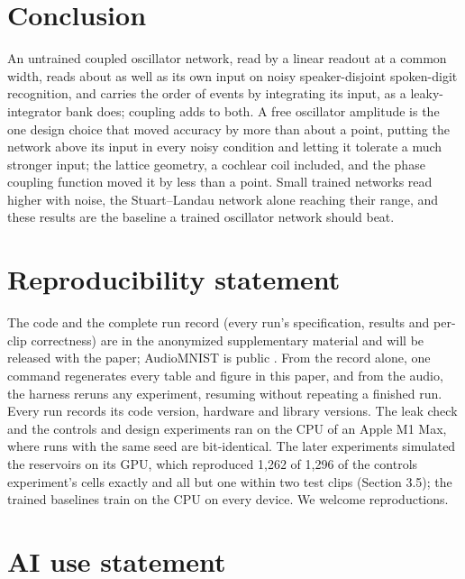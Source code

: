 \documentclass[10pt]{article}
\makeatletter
\newcommand{\tmlr@floatbarrier}{\par\vspace{\z@}%
  \ifx\@deferlist\@empty\else\clearpage\fi}
\let\tmlr@section\section
\renewcommand{\section}{\tmlr@floatbarrier\tmlr@section}
\makeatother
\begin{document}
\section{Conclusion}\label{conclusion}

An untrained coupled oscillator network, read by a linear readout at a
common width, reads about as well as its own input on noisy
speaker-disjoint spoken-digit recognition, and carries the order of
events by integrating its input, as a leaky-integrator bank does;
coupling adds to both. A free oscillator amplitude is the one design
choice that moved accuracy by more than about a point, putting the
network above its input in every noisy condition and letting it tolerate
a much stronger input; the lattice geometry, a cochlear coil included,
and the phase coupling function moved it by less than a point. Small
trained networks read higher with noise, the Stuart--Landau network
alone reaching their range, and these results are the baseline a trained
oscillator network should beat.

\section*{Reproducibility statement}\label{reproducibility-statement}

The code and the complete run record (every run's specification, results
and per-clip correctness) are in the anonymized supplementary material
and will be released with the paper; AudioMNIST is public
\citep{becker2024}. From the record alone, one command regenerates every
table and figure in this paper, and from the audio, the harness reruns
any experiment, resuming without repeating a finished run. Every run
records its code version, hardware and library versions. The leak check
and the controls and design experiments ran on the CPU of an Apple M1
Max, where runs with the same seed are bit-identical. The later
experiments simulated the reservoirs on its GPU, which reproduced 1,262
of 1,296 of the controls experiment's cells exactly and all but one
within two test clips (Section 3.5); the trained baselines train on the
CPU on every device. We welcome reproductions.

\section*{AI use statement}\label{ai-use-statement}
\end{document}
